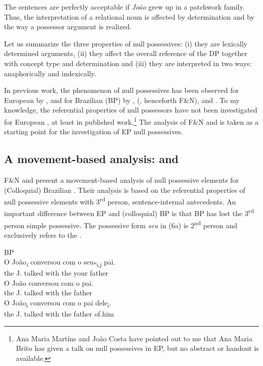 \documentclass[output=paper]{langsci/langscibook}
\begin{document}
The sentences are perfectly acceptable if \textit{João} grew up in a patchwork family. Thus, the interpretation of a relational noun is affected by determination and by the way a possessor argument is realized.

Let us summarize the three properties of null possessives: (i) they are lexically determined arguments, (ii) they affect the overall reference of the DP together with concept type and determination and (iii) they are interpreted in two ways: anaphorically and indexically.

In previous work, the phenomenon of null possessives has been observed for European  by \citet[350, Footnote 30]{Mateus2003}, and for Brazilian  (BP) by \citet{Floripi2003}, \citeauthor{Floripi2009} (\citeyear{Floripi2009}, henceforth F\&N), and \citet{Rodrigues2010}. To my knowledge, the referential properties of null possessors have not been investigated for European , at least in published work.\footnote{Ana Maria Martíns and João Costa have pointed out to me that Ana Maria Brito has given a talk on null possessives in EP, but no abstract or handout is available.} The analysis of F\&N and \citet{Rodrigues2010} is taken as a starting point for the investigation of EP null possessives.

\subsection{A movement-based analysis: \citet{Floripi2009} and \citet{Rodrigues2010}}%

F\&N and \citet{Rodrigues2010} present a movement-based analysis of null possessive elements for (Colloquial) Brazilian . Their analysis is based on the referential properties of null possessive elements with 3\textsuperscript{rd} person, sentence-internal antecedents. An important difference between EP and (colloquial) BP is that BP has lost the 3\textsuperscript{rd} person simple possessive. The possessive form \textit{seu} in (6a) is 2\textsuperscript{nd} person and exclusively refers to the .

\ea%
    BP\label{ex:wein:6}\\
    \ea
    \gll O João\textit{\textsubscript{i}} conversou com o   seu\textsubscript{*i,j} pai.\\
         the J.   talked   with the your   father\\
    \ex  
    \gll O João conversou com o pai.\\
         the J. talked with the father\\
    \ex  
    \gll O João\textsubscript{i} conversou com o pai dele\textsubscript{i}.\\
         the J.   talked with the father of.him\\
    \z
\z
\end{document}
